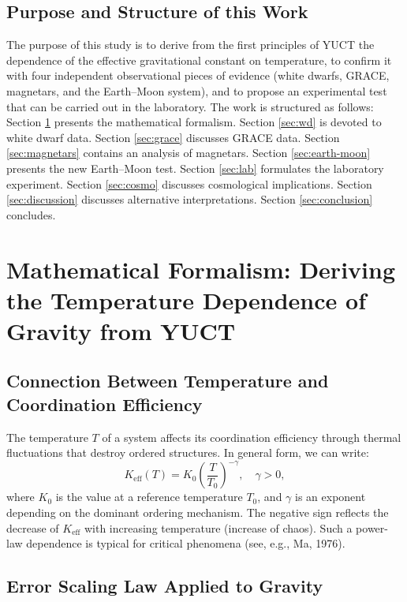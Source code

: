 \documentclass[12pt]{article}
\theoremstyle{remark}
\newcommand{\Keff}{K_{\mathrm{eff}}}
\begin{document}
	\subsection{Purpose and Structure of this Work}
	\label{subsec:purpose}
	
	The purpose of this study is to derive from the first principles of YUCT the dependence of the effective gravitational constant on temperature, to confirm it with four independent observational pieces of evidence (white dwarfs, GRACE, magnetars, and the Earth–Moon system), and to propose an experimental test that can be carried out in the laboratory. The work is structured as follows: Section \ref{sec:math} presents the mathematical formalism. Section \ref{sec:wd} is devoted to white dwarf data. Section \ref{sec:grace} discusses GRACE data. Section \ref{sec:magnetars} contains an analysis of magnetars. Section \ref{sec:earth-moon} presents the new Earth–Moon test. Section \ref{sec:lab} formulates the laboratory experiment. Section \ref{sec:cosmo} discusses cosmological implications. Section \ref{sec:discussion} discusses alternative interpretations. Section \ref{sec:conclusion} concludes.
	
	\section{Mathematical Formalism: Deriving the Temperature Dependence of Gravity from YUCT}
	\label{sec:math}
	
	\subsection{Connection Between Temperature and Coordination Efficiency}
	\label{subsec:temp-keff}
	
	The temperature $T$ of a system affects its coordination efficiency through thermal fluctuations that destroy ordered structures. In general form, we can write:
	\begin{equation}
		\Keff(T) = K_0 \left( \frac{T}{T_0} \right)^{-\gamma}, \quad \gamma > 0,
		\label{eq:keff-temp}
	\end{equation}
	where $K_0$ is the value at a reference temperature $T_0$, and $\gamma$ is an exponent depending on the dominant ordering mechanism. The negative sign reflects the decrease of $\Keff$ with increasing temperature (increase of chaos). Such a power-law dependence is typical for critical phenomena (see, e.g., Ma, 1976).
	
	\subsection{Error Scaling Law Applied to Gravity}
	\label{subsec:error-gravity}
	
\end{document}
